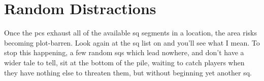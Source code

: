 \section{Random Distractions}

Once the \glspl{pc} exhaust all of the available \gls{sq} \glspl{segment} in a location, the area risks becoming plot-barren.
Look again at the \gls{sq} list on  and you'll see what I mean.
To stop this happening, a few random \glspl{sq} which lead nowhere, and don't have a wider tale to tell, sit at the bottom of the pile, waiting to catch players when they have nothing else to threaten them, but without beginning yet another \gls{sq}.
